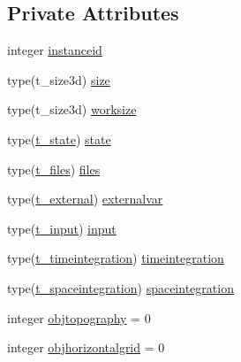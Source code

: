 \subsection*{Private Attributes}
\begin{DoxyCompactItemize}
\item 
integer \mbox{\hyperlink{structmodulehydrodynamicfile_1_1t__hydrodynamicfile_a708a6366af660a453c7a3266556ebbb7}{instanceid}}
\item 
type(t\+\_\+size3d) \mbox{\hyperlink{structmodulehydrodynamicfile_1_1t__hydrodynamicfile_a65ce4cfbab696d206e5854bea9082dfb}{size}}
\item 
type(t\+\_\+size3d) \mbox{\hyperlink{structmodulehydrodynamicfile_1_1t__hydrodynamicfile_acb39247f38a54bca5c367662603001e8}{worksize}}
\item 
type(\mbox{\hyperlink{structmodulehydrodynamicfile_1_1t__state}{t\+\_\+state}}) \mbox{\hyperlink{structmodulehydrodynamicfile_1_1t__hydrodynamicfile_ac8bec41e46e987d7233f19ce1fe664ab}{state}}
\item 
type(\mbox{\hyperlink{structmodulehydrodynamicfile_1_1t__files}{t\+\_\+files}}) \mbox{\hyperlink{structmodulehydrodynamicfile_1_1t__hydrodynamicfile_af8ad921201927262299faff7dc439655}{files}}
\item 
type(\mbox{\hyperlink{structmodulehydrodynamicfile_1_1t__external}{t\+\_\+external}}) \mbox{\hyperlink{structmodulehydrodynamicfile_1_1t__hydrodynamicfile_a7109b9e4b8c39affdc994a2d788937c5}{externalvar}}
\item 
type(\mbox{\hyperlink{structmodulehydrodynamicfile_1_1t__input}{t\+\_\+input}}) \mbox{\hyperlink{structmodulehydrodynamicfile_1_1t__hydrodynamicfile_a129f56695688b96c5c1a4f6481cbc47e}{input}}
\item 
type(\mbox{\hyperlink{structmodulehydrodynamicfile_1_1t__timeintegration}{t\+\_\+timeintegration}}) \mbox{\hyperlink{structmodulehydrodynamicfile_1_1t__hydrodynamicfile_a7e77e4754a987b666e612e25953ad452}{timeintegration}}
\item 
type(\mbox{\hyperlink{structmodulehydrodynamicfile_1_1t__spaceintegration}{t\+\_\+spaceintegration}}) \mbox{\hyperlink{structmodulehydrodynamicfile_1_1t__hydrodynamicfile_a0bb10c75241f56ed804c40d2005fb47f}{spaceintegration}}
\item 
integer \mbox{\hyperlink{structmodulehydrodynamicfile_1_1t__hydrodynamicfile_aa7c2bbafcaa904698377686615316ae8}{objtopography}} = 0
\item 
integer \mbox{\hyperlink{structmodulehydrodynamicfile_1_1t__hydrodynamicfile_afab984d8f9a792138f180833471572b8}{objhorizontalgrid}} = 0

\end{DoxyCompactItemize}
